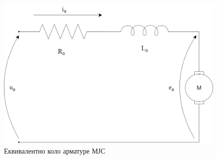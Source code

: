 \documentclass[12pt]{article}
\begin{document}
\begin{figure}[H]
    \centering
    \includegraphics[width=12cm]{figures/ekv_kolo_armatura.png}
    \caption{Еквивалентно коло арматуре МЈС}
    \label{fig:коло_арматуре}
\end{figure}
\end{document}

